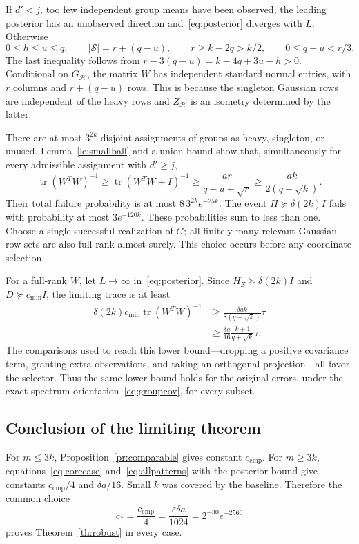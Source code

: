 \documentclass[11pt]{article}
\theoremstyle{remark}\newtheorem{remark}[theorem]{Remark}
\newcommand{\tr}{\operatorname{tr}}
\newcommand{\eps}{\varepsilon}
\newcommand{\cstar}{c_*}
\begin{document}
If $d'<j$, too few independent group means have been observed; the leading posterior has an unobserved direction and~\eqref{eq:posterior} diverges with $L$. Otherwise
\[
 0\le h\le u\le q,
 \qquad |\mathcal S|=r+(q-u),
 \qquad r\ge k-2q>k/2,
 \qquad 0\le q-u<r/3.
\]
The last inequality follows from
$r-3(q-u)=k-4q+3u-h>0$.
Conditional on $G_{\mathcal H}$, the matrix $W$ has independent standard normal entries, with $r$ columns and $r+(q-u)$ rows. This is because the singleton Gaussian rows are independent of the heavy rows and $Z_{\mathcal H}$ is an isometry determined by the latter.

There are at most $3^{2k}$ disjoint assignments of groups as heavy, singleton, or unused. Lemma~\ref{le:smallball} and a union bound show that, simultaneously for every admissible assignment with $d'\ge j$,
\begin{equation}\label{eq:allpatterns}
 \tr(W^TW)^{-1}\ge\tr(W^TW+I)^{-1}
 \ge\frac{a r}{q-u+\sqrt r}
 \ge\frac{a k}{2(q+\sqrt k)}.
\end{equation}
Their total failure probability is at most $8\,3^{2k}e^{-25k}$. The event $H\succeq\delta(2k)I$ fails with probability at most $3e^{-120k}$. These probabilities sum to less than one. Choose a single successful realization of $G$; all finitely many relevant Gaussian row sets are also full rank almost surely. This choice occurs before any coordinate selection.

For a full-rank $W$, let $L\to\infty$ in~\eqref{eq:posterior}. Since $H_Z\succeq\delta(2k)I$ and $D\succeq c_{\min}I$, the limiting trace is at least
\begin{align*}
 \delta(2k)c_{\min}\tr(W^TW)^{-1}
 &\ge\frac{\delta a k}{8(q+\sqrt k)}\tau\\
 &\ge\frac{\delta a}{16}\frac{k+1}{q+\sqrt k}\tau.
\end{align*}
The comparisons used to reach this lower bound---dropping a positive covariance term, granting extra observations, and taking an orthogonal projection---all favor the selector. Thus the same lower bound holds for the original errors, under the exact-spectrum orientation~\eqref{eq:groupcov}, for every subset.

\subsection{Conclusion of the limiting theorem}
For $m\le3k$, Proposition~\ref{pr:comparable} gives constant $c_{\mathrm{cmp}}$. For $m\ge3k$, equations~\eqref{eq:corecase} and~\eqref{eq:allpatterns} with the posterior bound give constants $c_{\mathrm{cmp}}/4$ and $\delta a/16$. Small $k$ was covered by the baseline. Therefore the common choice
\[
 \cstar=\frac{c_{\mathrm{cmp}}}{4}
 =\frac{\eps\delta a}{1024}
 =2^{-30}e^{-2560}
\]
proves Theorem~\ref{th:robust} in every case.
\end{document}
